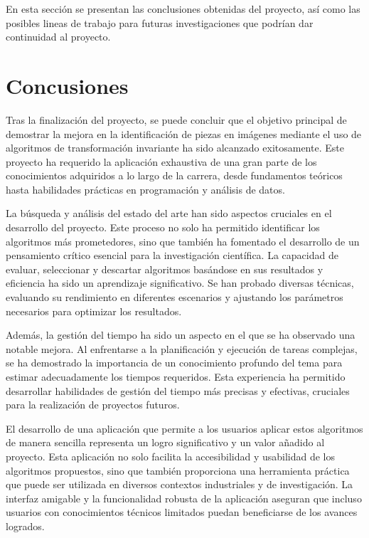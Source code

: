
En esta sección se presentan las conclusiones obtenidas del proyecto, así como las posibles lineas de trabajo para futuras investigaciones que podrían dar continuidad al proyecto.

\section{Concusiones}\label{conclusiones}

Tras la finalización del proyecto, se puede concluir que el objetivo principal de demostrar la mejora en la identificación de piezas en imágenes mediante el uso de algoritmos de transformación invariante ha sido alcanzado exitosamente. Este proyecto ha requerido la aplicación exhaustiva de una gran parte de los conocimientos adquiridos a lo largo de la carrera, desde fundamentos teóricos hasta habilidades prácticas en programación y análisis de datos.

La búsqueda y análisis del estado del arte han sido aspectos cruciales en el desarrollo del proyecto. Este proceso no solo ha permitido identificar los algoritmos más prometedores, sino que también ha fomentado el desarrollo de un pensamiento crítico esencial para la investigación científica. La capacidad de evaluar, seleccionar y descartar algoritmos basándose en sus resultados y eficiencia ha sido un aprendizaje significativo. Se han probado diversas técnicas, evaluando su rendimiento en diferentes escenarios y ajustando los parámetros necesarios para optimizar los resultados.

Además, la gestión del tiempo ha sido un aspecto en el que se ha observado una notable mejora. Al enfrentarse a la planificación y ejecución de tareas complejas, se ha demostrado la importancia de un conocimiento profundo del tema para estimar adecuadamente los tiempos requeridos. Esta experiencia ha permitido desarrollar habilidades de gestión del tiempo más precisas y efectivas, cruciales para la realización de proyectos futuros.

El desarrollo de una aplicación que permite a los usuarios aplicar estos algoritmos de manera sencilla representa un logro significativo y un valor añadido al proyecto. Esta aplicación no solo facilita la accesibilidad y usabilidad de los algoritmos propuestos, sino que también proporciona una herramienta práctica que puede ser utilizada en diversos contextos industriales y de investigación. La interfaz amigable y la funcionalidad robusta de la aplicación aseguran que incluso usuarios con conocimientos técnicos limitados puedan beneficiarse de los avances logrados.


